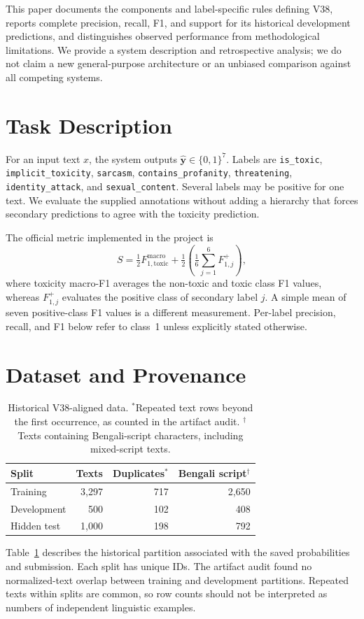 \documentclass[10pt,a4paper]{article}
\begin{document}
This paper documents the components and label-specific rules defining V38, reports complete precision, recall, F1, and support for its historical development predictions, and distinguishes observed performance from methodological limitations. We provide a system description and retrospective analysis; we do not claim a new general-purpose architecture or an unbiased comparison against all competing systems.

\section{Task Description}
For an input text $x$, the system outputs $\hat{\mathbf y}\in\{0,1\}^7$. Labels are \texttt{is\_toxic}, \texttt{implicit\_toxicity}, \texttt{sarcasm}, \texttt{contains\_profanity}, \texttt{threatening}, \texttt{identity\_attack}, and \texttt{sexual\_content}. Several labels may be positive for one text. We evaluate the supplied annotations without adding a hierarchy that forces secondary predictions to agree with the toxicity prediction.

The official metric implemented in the project is
\begin{equation}
 S=\tfrac12 F_{1,\mathrm{toxic}}^{\mathrm{macro}}
 +\tfrac12\left(\tfrac16\sum_{j=1}^{6}F_{1,j}^{+}\right),
 \label{eq:metric}
\end{equation}
where toxicity macro-F1 averages the non-toxic and toxic class F1 values, whereas $F_{1,j}^{+}$ evaluates the positive class of secondary label $j$. A simple mean of seven positive-class F1 values is a different measurement. Per-label precision, recall, and F1 below refer to class~1 unless explicitly stated otherwise.

\section{Dataset and Provenance}
\begin{table}[t]\centering\small
\begin{tabular}{lrrr}\toprule
Split & Texts & Duplicates$^*$ & Bengali script$^\dagger$\\\midrule
Training & 3,297 & 717 & 2,650\\
Development & 500 & 102 & 408\\
Hidden test & 1,000 & 198 & 792\\\bottomrule
\end{tabular}
\caption{Historical V38-aligned data. $^*$Repeated text rows beyond the first occurrence, as counted in the artifact audit. $^\dagger$Texts containing Bengali-script characters, including mixed-script texts.}\label{tab:splits}
\end{table}
Table~\ref{tab:splits} describes the historical partition associated with the saved probabilities and submission. Each split has unique IDs. The artifact audit found no normalized-text overlap between training and development partitions. Repeated texts within splits are common, so row counts should not be interpreted as numbers of independent linguistic examples.
\end{document}
